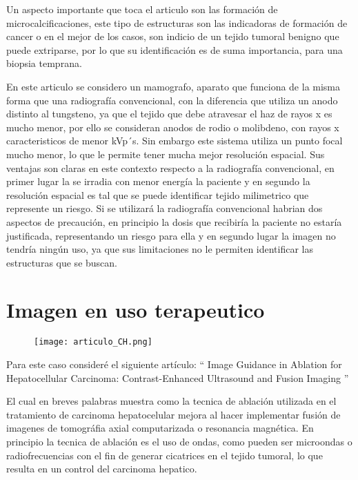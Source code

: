 \documentclass{article}
\begin{document}
\vspace{10pt}

Un aspecto importante que toca el articulo son las formación de microcalcificaciones,  este tipo de estructuras son las indicadoras de formación de cancer o en el mejor de los casos, son indicio de un tejido tumoral benigno que puede extriparse, por lo que su identificación es de suma importancia, para una biopsia temprana.

\vspace{10pt}


En este articulo se considero un mamografo, aparato que funciona de la misma forma que una radiografía convencional, con la diferencia que utiliza un anodo distinto al tungsteno, ya que el tejido que debe atravesar el haz de rayos x es mucho menor, por ello se consideran anodos de rodio o molibdeno, con rayos x caracteristicos de menor kVp´s. Sin embargo este sistema utiliza un punto focal mucho menor, lo que le permite tener mucha mejor resolución espacial. Sus ventajas son claras en este contexto respecto a la radiografía convencional, en primer lugar la se irradia con menor energía la paciente y en segundo la resolución espacial es tal que se puede identificar tejido milimetrico que represente un riesgo. Si se utilizará la radiografía convencional habrian dos aspectos de precaución, en principio la dosis que recibiría la paciente no estaría justificada, representando un riesgo para ella y en segundo lugar la imagen no tendría ningún uso, ya que sus limitaciones no le permiten identificar las estructuras que se buscan.

\newpage

\section{Imagen en uso terapeutico}

\begin{figure}[h!]
    \centering
    \texttt{[image: articulo\_CH.png]}
\end{figure}


Para este caso consideré el siguiente artículo: `` Image Guidance in Ablation for Hepatocellular Carcinoma: Contrast-Enhanced Ultrasound and Fusion Imaging ''

\vspace{10pt}

El cual en breves palabras muestra como la tecnica de ablación utilizada en el tratamiento de carcinoma hepatocelular mejora al hacer implementar fusión de imagenes de tomográfia axial computarizada o resonancia magnética. En principio la tecnica de ablación es el uso de ondas, como pueden ser microondas o radiofrecuencias con el fin de generar cicatrices en el tejido tumoral, lo que resulta en un control del carcinoma hepatico.
\vspace{10pt}
\end{document}
